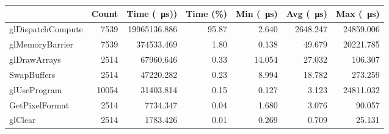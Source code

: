\documentclass[a4paper, 12pt, oneside]{book}
\begin{document}
\begin{landscape}
\begin{table}[ht]
\begin{tabular} {| >{\ttfamily}l | r | r | r | r | r | r |}
        \hline
        \multicolumn{1}{|c|}{\cellcolor{black!10} Name } & \multicolumn{1}{|c|}{\cellcolor{black!10} Count } & \multicolumn{1}{|c|}{\cellcolor{black!10} Time (\SI{}{\micro\second})) } & \multicolumn{1}{|c|}{\cellcolor{black!10} Time (\%) } & \multicolumn{1}{|c|}{\cellcolor{black!10} Min (\SI{}{\micro\second}) } & \multicolumn{1}{|c|}{\cellcolor{black!10} Avg (\SI{}{\micro\second}) } & \multicolumn{1}{|c|}{\cellcolor{black!10} Max (\SI{}{\micro\second}) }  \\ \hline
        glDispatchCompute & 7539  & 19965136.886    & 95.87  & 2.640    & 2648.247 & 24859.006 \\ \hline
        glMemoryBarrier   & 7539  & 374533.469      & 1.80   & 0.138    & 49.679   & 20221.785 \\ \hline
        glDrawArrays      & 2514  & 67960.646       & 0.33   & 14.054   & 27.032   & 106.307   \\ \hline
        SwapBuffers       & 2514  & 47220.282       & 0.23   & 8.994    & 18.782   & 273.259   \\ \hline
        glUseProgram      & 10054 & 31403.814       & 0.15   & 0.127    & 3.123    & 24811.032 \\ \hline
        GetPixelFormat    & 2514  & 7734.347        & 0.04   & 1.680    & 3.076    & 90.057    \\ \hline
        glClear           & 2514  & 1783.426        & 0.01   & 0.269    & 0.709    & 25.131    \\ \hline
    \end{tabular}
\end{table}

\end{landscape}
\end{document}
